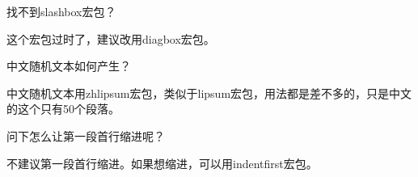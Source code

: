 \documentclass[QAofGroup.tex]{subfiles}
\begin{document}
\begin{qst}\label{Q2018020805}
 找不到slashbox宏包？
\end{qst}
\ans 这个宏包过时了，建议改用diagbox宏包。

\begin{qst}\label{Q2018020806}
 中文随机文本如何产生？
\end{qst}
\ans 中文随机文本用zhlipsum宏包，类似于lipsum宏包，用法都是差不多的，只是中文的这个只有50个段落。

\begin{qst}\label{Q2018020807}
 问下怎么让第一段首行缩进呢？
\end{qst}
\ans 不建议第一段首行缩进。如果想缩进，可以用indentfirst宏包。

\end{document}
